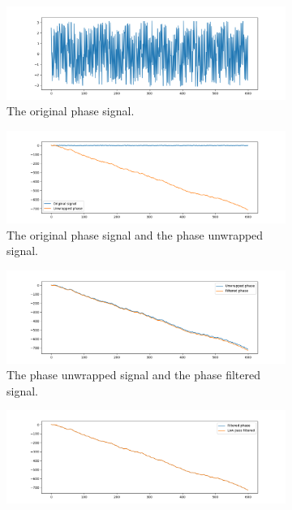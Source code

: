 \begin{figure}
	\centering
	\begin{subfigure}{0.49\textwidth}
		\centering
		\includegraphics[width=\textwidth]{figures/phase_original}
		\caption{The original phase signal.}
	\end{subfigure}
	\hfill
	\begin{subfigure}{0.49\textwidth}
		\centering
		\includegraphics[width=\textwidth]{figures/phase_step_1}
		\caption{The original phase signal and the phase unwrapped signal.}
	\end{subfigure}
	\hfill
	\begin{subfigure}{0.49\textwidth}
		\centering
		\includegraphics[width=\textwidth]{figures/phase_step_2}
		\caption{The phase unwrapped signal and the phase filtered signal.}
	\end{subfigure}
	\hfill
	\begin{subfigure}{0.49\textwidth}
		\centering
		\includegraphics[width=\textwidth]{figures/phase_step_3}

\end{subfigure}
\end{figure}
